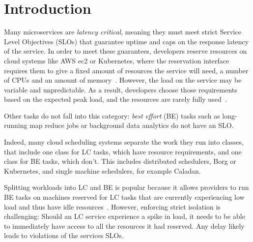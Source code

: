 \section{Introduction}
\label{s:intro}

Many microservices are \textit{latency critical}, meaning they must meet strict
Service Level Objectives (SLOs) that guarantee uptime and caps on the response
latency of the service. In order to meet these guarantees, developers reserve
resources on cloud systems like AWS ec2 or Kubernetes, where the reservation
interface requires them to give a fixed amount of resources the service will
need, \ie{} a number of CPUs and an amount of memory~\cite{aws-ec2-resources,
kubernetes-resources}. However, the load on the service may be variable and
unpredictable. As a result, developers choose those requirements based on the
expected peak load, and the resources are rarely fully used~\cite{borg, nu,
overprovision}.

Other tasks do not fall into this category: \textit{best effort} (BE) tasks such
as long-running map reduce jobs or background data analytics do not have an SLO.

Indeed, many cloud scheduling systems separate the work they run into classes,
that include one class for LC tasks, which have resource requirements, and one
class for BE tasks, which don't. This includes distributed schedulers, \eg{}
Borg\cite{borg} or Kubernetes\cite{kubernetes-resources}, and single machine
schedulers, for example Caladan\cite{caladan}.

Splitting workloads into LC and BE is popular because it allows providers to run
BE tasks on machines reserved for LC tasks that are currently experiencing low
load and thus have idle resources~\cite{perfiso}. However, enforcing strict
isolation is challenging: Should an LC service experience a spike in load, it
needs to be able to immediately have access to all the resources it had
reserved. Any delay likely leads to violations of the services SLOs.

